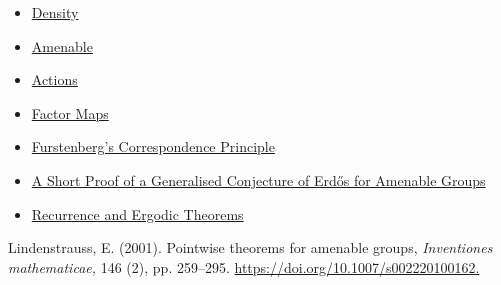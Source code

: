 \documentclass[
  british,
]{article}
\newlength{\cslhangindent}
\newenvironment{CSLReferences}[2] %
 {\begin{list}{}{%
  \setlength{\itemindent}{0pt}
  \setlength{\leftmargin}{0pt}
  \setlength{\parsep}{0pt}
  \ifodd #1
   \setlength{\leftmargin}{\cslhangindent}
   \setlength{\itemindent}{-1\cslhangindent}
  \fi
  \setlength{\itemsep}{#2\baselineskip}}}
 {\end{list}}
\providecommand{\tightlist}{%
  \setlength{\itemsep}{0pt}\setlength{\parskip}{0pt}}
\theoremstyle{plain}
\theoremstyle{definition}
\theoremstyle{remark}
\begin{document}
\begin{itemize}
\tightlist
\item
  \href{../../MathsNotes/1_Amenable_and_Density/density.html}{Density}
\item
  \href{../../MathsNotes/1_Amenable_and_Density/amenable.html}{Amenable}
\item
  \href{../../MathsNotes/2_Topological_Dynamics/actions.html}{Actions}
\item
  \href{../../MathsNotes/2_Topological_Dynamics/factor-maps.html}{Factor Maps}
\item
  \href{../../MathsNotes/2_Topological_Dynamics/furstenberg-correspondence.html}{Furstenberg's Correspondence Principle}
\item
  \href{../../GeneralisedErdosConjecture/ErdosConjecture.html}{A Short Proof of a Generalised Conjecture of Erdős for Amenable Groups}
\item
  \href{../../MathsNotes/2_Topological_Dynamics/recurrence-and-Ergodic-theorem.html}{Recurrence and Ergodic Theorems}
\end{itemize}

\label{refs}
\begin{CSLReferences}{1}{0}
Lindenstrauss, E. (2001). \textquotesingle Pointwise theorems for
amenable groups\textquotesingle, \emph{\emph{Inventiones mathematicae},}
146 (2), pp. 259--295.
\href{https://doi.org/10.1007/s002220100162}{https://doi.org/10.1007/s002220100162.}

\end{CSLReferences}
\end{document}
